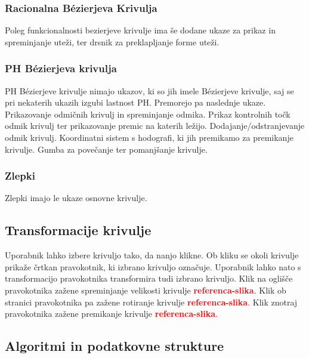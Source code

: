 \documentclass[isrm2, tisk]{fmfdelo}
\newcommand{\mycomment}[1]{\textbf{\textcolor{red}{#1}}}
\newcommand{\missingref}[1]{\mycomment{referenca-#1}}
\begin{document}
    \subsubsection{Racionalna Bézierjeva Krivulja}
    Poleg funkcionalnosti bezierjeve krivulje ima še dodane ukaze za prikaz in spreminjanje uteži, ter drsnik za preklapljanje forme uteži.

    \subsubsection{PH Bézierjeva krivulja}
    PH Bézierjeve krivulje nimajo ukazov, ki so jih imele Bézierjeve krivulje, saj se pri nekaterih ukazih izgubi lastnost PH.
    Premorejo pa naslednje ukaze.
    Prikazovanje odmičnih krivulj in spreminjanje odmika.
    Prikaz kontrolnih točk odmik krivulj ter prikazovanje premic na katerih ležijo.
    Dodajanje/odstranjevanje odmik krivulj.
    Koordinatni sistem s hodografi, ki jih premikamo za premikanje krivulje.
    Gumba za povečanje ter pomanjšanje krivulje.

    \subsubsection{Zlepki}
    Zlepki imajo le ukaze osnovne krivulje.

    \subsection{Transformacije krivulje}
    Uporabnik lahko izbere krivuljo tako, da nanjo klikne.
    Ob kliku se okoli krivulje prikaže črtkan pravokotnik, ki izbrano krivuljo označuje.
    Uporabnik lahko nato s transformacijo pravokotnika transformira tudi izbrano krivuljo.
    Klik na oglišče pravokotnika zažene spreminjanje velikosti krivulje \missingref{slika}.
    Klik ob stranici pravokotnika pa zažene rotiranje krivulje \missingref{slika}.
    Klik znotraj pravokotnika zažene premikanje krivulje \missingref{slika}.

    \subsection{Algoritmi in podatkovne strukture}
\end{document}
